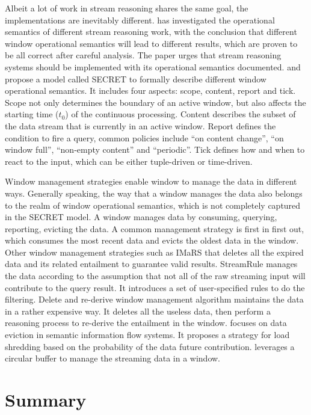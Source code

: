 Albeit a lot of work in stream reasoning shares the same goal, the implementations are inevitably different.   
\cite{dell2013correctness} has investigated the operational semantics of different stream reasoning work, with the conclusion that different window operational semantics will lead to different results, which are proven to be all correct after careful analysis.
The paper urges that stream reasoning systems should be implemented with its operational semantics documented. 
\cite{botan2010secret} and \cite{dindar2013modeling} propose a model called SECRET to formally describe different window operational semantics.
It includes four aspects: scope, content, report and tick. 
Scope not only determines the boundary of an active window, but also affects the starting time ($t_{0}$) of the continuous processing.
Content describes the subset of the data stream that is currently in an active window.
Report defines the condition to fire a query, common policies include ``on content change'', ``on window full'', ``non-empty content'' and ``periodic''.
Tick defines how and when to react to the input, which can be either tuple-driven or time-driven.

Window management strategies enable window to manage the data in different ways. 
Generally speaking, the way that a window manages the data also belongs to the realm of window operational semantics, which is not completely captured in the SECRET model.
A window manages data by consuming, querying, reporting, evicting the data. 
A common management strategy is first in first out, which consumes the most recent data and evicts the oldest data in the window. 
Other window management strategies such as IMaRS \cite{barbieri2010incremental} that deletes all the expired data and its related entailment to guarantee valid results. 
StreamRule \cite{mileo2013streamrule} manages the data according to the assumption that not all of the raw streaming input will contribute to the query result. 
It introduces a set of user-specified rules to do the filtering. 
Delete and re-derive window management algorithm \cite{volz2005incrementally} maintains the data in a rather expensive way. 
It deletes all the useless data, then perform a reasoning process to re-derive the entailment in the window.
\cite{nguyen2013eviction} focuses on data eviction in semantic information flow systems. 
It proposes a strategy for load shredding based on the probability of the data future contribution.
\cite{gao2014clock} leverages a circular buffer to manage the streaming data in a window. 
%
\section{Summary}

